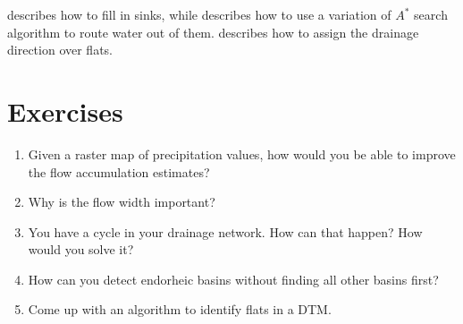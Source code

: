 \citet{Barnes14a} describes how to fill in sinks, while \citet{Metz11} describes how to use a variation of \(A^{*}\) search algorithm to route water out of them.
\citet{Barnes14} describes how to assign the drainage direction over flats.

%
\section{Exercises}

\begin{enumerate}
\item Given a raster map of precipitation values, how would you be able to improve the flow accumulation estimates?
\item Why is the flow width important?
\item You have a cycle in your drainage network. How can that happen? How would you solve it?
\item How can you detect endorheic basins without finding all other basins first?
\item Come up with an algorithm to identify flats in a DTM\@.
\end{enumerate}
